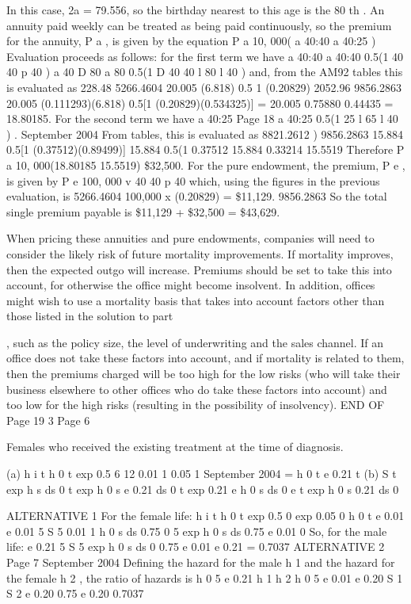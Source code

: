 \documentclass[a4paper,12pt]{article}
\begin{document}
\item 
In this case, 2a = 79.556, so the birthday nearest to this age is the 80 th .
An annuity paid weekly can be treated as being paid continuously, so the
premium for the annuity, P a , is given by the equation
P a 10, 000( a 40:40 a 40:25 )
Evaluation proceeds as follows: for the first term we have
a 40:40 a 40:40 0.5(1 40 40 p 40 )
a 40
D 80
a 80 0.5(1
D 40
40 l 80
l 40
)
and, from the AM92 tables this is evaluated as
228.48
5266.4604
20.005
(6.818) 0.5 1 (0.20829)
2052.96
9856.2863
20.005 (0.111293)(6.818) 0.5[1 (0.20829)(0.534325)]
= 20.005 0.75880 0.44435
= 18.80185.
For the second term we have
a 40:25
Page 18
a 40:25
0.5(1
25 l 65
l 40
) . %
September 2004
From tables, this is evaluated as
8821.2612
)
9856.2863
15.884 0.5[1 (0.37512)(0.89499)]
15.884 0.5(1 0.37512
15.884 0.33214
15.5519
Therefore
P a
10, 000(18.80185 15.5519)
\$32,500.
For the pure endowment, the premium, P e , is given by
P e
100, 000 v 40 40 p 40
which, using the figures in the previous evaluation, is
5266.4604
100,000 x (0.20829)
= \$11,129.
9856.2863
So the total single premium payable is
\$11,129 + \$32,500 = \$43,629.
\item 
When pricing these annuities and pure endowments, companies will need to
consider the likely risk of future mortality improvements.
If mortality improves, then the expected outgo will increase. Premiums
should be set to take this into account, for otherwise the office might become
insolvent.
In addition, offices might wish to use a mortality basis that takes into account
factors other than those listed in the solution to part \item , such as the policy size,
the level of underwriting and the sales channel.
If an office does not take these factors into account, and if mortality is related
to them, then the premiums charged will be too high for the low risks (who
will take their business elsewhere to other offices who do take these factors
into account) and too low for the high risks (resulting in the possibility of
insolvency).
END OF %
Page 19
3
Page 6
\item  Females who received the existing treatment at the time of diagnosis.
\item  (a)
h i t
h 0 t exp
0.5
6
12
0.01 1
0.05 1 %
September 2004
= h 0 t e 0.21
t
(b)
S t
exp
h s
ds
0
t
exp
h 0 s
e
0.21
ds
0
t
exp
0.21
e
h 0 s
ds
0
e
t
exp
h 0 s
0.21
ds
0
\item 
ALTERNATIVE 1
For the female life:
h i t
h 0 t exp 0.5 0
exp
0.05 0
h 0 t e 0.01
e 0.01
5
S 5
0.01 1
h 0 s
ds
0.75
0
5
exp
h 0 s
ds
0.75
e
0.01
0
So, for the male life:
e 0.21
5
S 5
exp
h 0 s
ds
0
0.75
e
0.01
e 0.21
= 0.7037
ALTERNATIVE 2
Page 7 %
September 2004
Defining the hazard for the male h 1 and the hazard for the female h 2 , the ratio
of hazards is
h 0 5 e 0.21
h 1
h 2
h 0 5 e 0.01
e 0.20
S 1
S 2
e 0.20
0.75
e 0.20
0.7037
\end{document}
